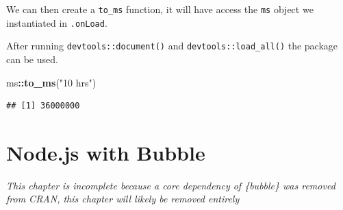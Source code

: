 \documentclass[
]{krantz}
\makeatletter
\newenvironment{Shaded}{\begin{snugshade}}{\end{snugshade}}
\newcommand{\CommentTok}[1]{\textcolor[rgb]{0.37,0.37,0.37}{\textit{#1}}}
\newcommand{\ControlFlowTok}[1]{\textcolor[rgb]{0.27,0.27,0.27}{\textbf{#1}}}
\newcommand{\DataTypeTok}[1]{\textcolor[rgb]{0.27,0.27,0.27}{#1}}
\newcommand{\KeywordTok}[1]{\textcolor[rgb]{0.27,0.27,0.27}{\textbf{#1}}}
\newcommand{\NormalTok}[1]{#1}
\newcommand{\OperatorTok}[1]{\textcolor[rgb]{0.43,0.43,0.43}{\textbf{#1}}}
\newcommand{\OtherTok}[1]{\textcolor[rgb]{0.37,0.37,0.37}{#1}}
\newcommand{\StringTok}[1]{\textcolor[rgb]{0.5,0.5,0.5}{#1}}
\newenvironment{kframe}{%
\medskip{}
\setlength{\fboxsep}{.8em}
 \def\at@end@of@kframe{}%
 \ifinner\ifhmode%
  \def\at@end@of@kframe{\end{minipage}}%
  \begin{minipage}{\columnwidth}%
 \fi\fi%
 \def\FrameCommand##1{\hskip\@totalleftmargin \hskip-\fboxsep
 \colorbox{shadecolor}{##1}\hskip-\fboxsep
     \hskip-\linewidth \hskip-\@totalleftmargin \hskip\columnwidth}%
 \MakeFramed {\advance\hsize-\width
   \@totalleftmargin\z@ \linewidth\hsize
   \@setminipage}}%
 {\par\unskip\endMakeFramed%
 \at@end@of@kframe}
\renewenvironment{Shaded}{\begin{kframe}}{\end{kframe}}
\makeatother
\begin{document}
\begin{Shaded}
\end{Shaded}

We can then create a \texttt{to\_ms} function, it will have access the \texttt{ms} object we instantiated in \texttt{.onLoad}.

\begin{Shaded}
\end{Shaded}

After running \texttt{devtools::document()} and \texttt{devtools::load\_all()} the package can be used.

\begin{Shaded}
\begin{Highlighting}[]
\NormalTok{ms}\OperatorTok{::}\KeywordTok{to\_ms}\NormalTok{(}\StringTok{"10 hrs"}\NormalTok{)}
\end{Highlighting}
\end{Shaded}

\begin{verbatim}
## [1] 36000000
\end{verbatim}

\hypertarget{node}{%
\chapter{Node.js with Bubble}\label{node}}

\emph{This chapter is incomplete because a core dependency of \{bubble\} was removed from CRAN, this chapter will likely be removed entirely}
\end{document}
